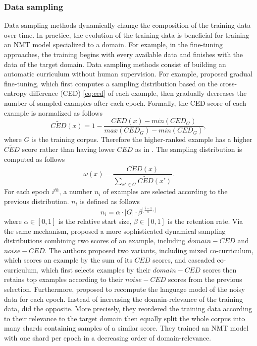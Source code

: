 \subsubsection{Data sampling}
Data sampling methods dynamically change the composition of the training data over time. In practice, the evolution of the training data is beneficial for training an NMT model specialized to a domain. For example, in the fine-tuning approaches, the training begins with every available data and finishes with the data of the target domain. Data sampling methods consist of building an automatic curriculum without human supervision. For example, \citet{Wees17dynamic} proposed gradual fine-tuning, which first computes a sampling distribution based on the cross-entropy difference (CED) \eqref{eq:ced} of each example, then gradually decreases the number of sampled examples after each epoch. Formally, the CED score of each example is normalized as follows
\begin{equation}
\tilde{CED}(x) = 1 - \frac{CED(x)-min(CED_{G})}{max(CED_{G}) - min(CED_{G})},
\end{equation}
where $G$ is the training corpus. Therefore the higher-ranked example has a higher $\tilde{CED}$ score rather than having lower $CED$ as in \citet{Axelrod11domain}. The sampling distribution is computed as follows
\begin{equation}
\omega(x) = \frac{\tilde{CED}(x)}{\sum_{x'\in G} \tilde{CED}(x')}.
\end{equation}
For each epoch $i^{th}$, a number $n_i$ of examples are selected according to the previous distribution. $n_i$ is defined as follows
\begin{equation}
n_i = \alpha \cdot |G| \cdot \beta^{\lfloor \frac{i-1}{n}, \rfloor}
\end{equation}
where $\alpha \in [0,1]$ is the relative start size, $\beta \in [0,1]$ is the retention rate. Via the same mechanism, \citet{Wang19dynamically} proposed a more sophisticated dynamical sampling distributions combining two scores of an example, including $domain-CED$ and $noise-CED$. The authors proposed two variants, including mixed co-curriculum, which scores an example by the sum of its $CED$ scores, and cascaded co-curriculum, which first selects examples by their $domain-CED$ scores then retains top examples according to their $noise-CED$ scores from the previous selection. Furthermore, \citet{Wang19dynamically} proposed to recompute the language model of the noisy data for each epoch. Instead of increasing the domain-relevance of the training data, \citet{Zhang19curriculum} did the opposite. More precisely, they reordered the training data according to their relevance to the target domain then equally split the whole corpus into many shards containing samples of a similar score. They trained an NMT model with one shard per epoch in a decreasing order of domain-relevance.

